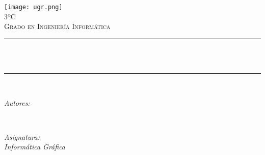 \begin{titlepage}
	\centering
	\vspace*{0.5 cm}
	\texttt{[image: ugr.png]}\\[1.0 cm]
	\textsc{\large 3ºC}\\[0.5 cm]            
	\textsc{\large Grado en Ingeniería Informática}\\[0.5 cm]              
	\rule{\linewidth}{0.2 mm} \\[0.4 cm]
	{ \huge \bfseries \thetitle}\\
	\rule{\linewidth}{0.2 mm} \\[1.5 cm]
	
	\begin{minipage}{0.4\textwidth}
		\begin{flushleft} \large
			\emph{Autores:}\\
			
			\small \theauthor
		\end{flushleft}
	\end{minipage}~
	\begin{minipage}{0.4\textwidth}
		\begin{flushright} \large
			\emph{Asignatura: \\
				Informática Gráfica}                   
		\end{flushright}
	\end{minipage}\\[1 cm]
	
	{\small \thedate}\\[1 cm]
	
	\vfill
	
\end{titlepage}